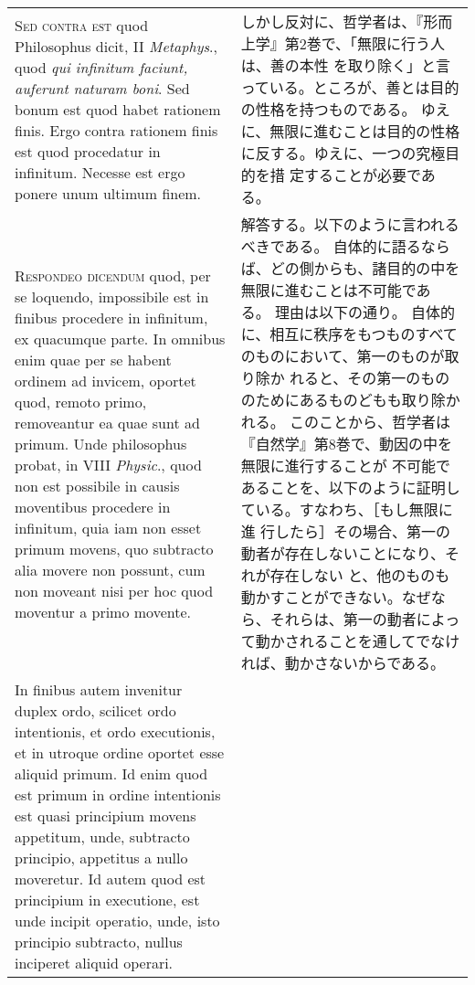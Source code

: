 \documentclass[10pt]{jsarticle} %
\begin{document}
\begin{longtable}{p{21em}p{21em}}
\\


{\scshape Sed contra est} quod Philosophus dicit,
II {\itshape Metaphys}., quod {\itshape qui infinitum faciunt, auferunt naturam boni}. Sed
bonum est quod habet rationem finis. Ergo contra rationem finis est quod
procedatur in infinitum. Necesse est ergo ponere unum ultimum finem.

&

しかし反対に、哲学者は、『形而上学』第2巻で、「無限に行う人は、善の本性
 を取り除く」と言っている。ところが、善とは目的の性格を持つものである。
 ゆえに、無限に進むことは目的の性格に反する。ゆえに、一つの究極目的を措
 定することが必要である。


\\


{\scshape Respondeo dicendum} quod, per se loquendo,
impossibile est in finibus procedere in infinitum, ex quacumque
parte. In omnibus enim quae per se habent ordinem ad invicem, oportet
quod, remoto primo, removeantur ea quae sunt ad primum. Unde philosophus
probat, in VIII {\itshape Physic}., quod non est possibile in causis moventibus
procedere in infinitum, quia iam non esset primum movens, quo subtracto
alia movere non possunt, cum non moveant nisi per hoc quod moventur a
primo movente. 


&

解答する。以下のように言われるべきである。
自体的に語るならば、どの側からも、諸目的の中を無限に進むことは不可能であ
 る。
理由は以下の通り。
自体的に、相互に秩序をもつものすべてのものにおいて、第一のものが取り除か
 れると、その第一のもののためにあるものどもも取り除かれる。
このことから、哲学者は『自然学』第8巻で、動因の中を無限に進行することが
 不可能であることを、以下のように証明している。すなわち、［もし無限に進
 行したら］その場合、第一の動者が存在しないことになり、それが存在しない
 と、他のものも動かすことができない。なぜなら、それらは、第一の動者によっ
 て動かされることを通してでなければ、動かさないからである。


\\



In finibus autem invenitur duplex ordo, scilicet ordo
intentionis, et ordo executionis, et in utroque ordine oportet esse
aliquid primum. Id enim quod est primum in ordine intentionis est quasi
principium movens appetitum, unde, subtracto principio, appetitus a
nullo moveretur. Id autem quod est principium in executione, est unde
incipit operatio, unde, isto principio subtracto, nullus inciperet
aliquid operari. 




\end{longtable}
\end{document}
